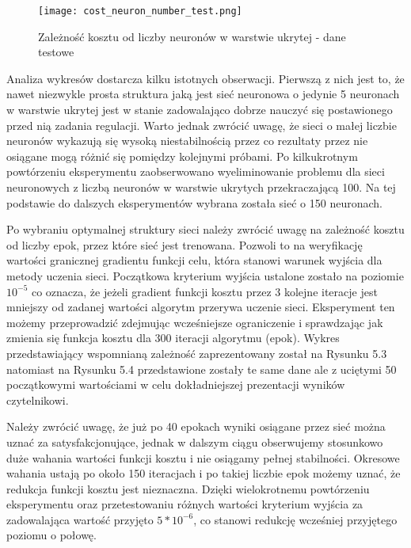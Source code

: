 \begin{figure}[!h]
  \label{fig:Koszt-liczba-neuronow-testowe}
  \centering \texttt{[image: cost\_neuron\_number\_test.png]}
  \caption{Zależność kosztu od liczby neuronów w warstwie ukrytej - dane testowe}
\end{figure}

\par Analiza wykresów dostarcza kilku istotnych obserwacji. Pierwszą z nich jest to, że nawet niezwykle prosta struktura jaką jest sieć neuronowa o jedynie 5 neuronach w warstwie ukrytej jest w stanie zadowalająco dobrze nauczyć się postawionego przed nią zadania regulacji. Warto jednak zwrócić uwagę, że sieci o małej liczbie neuronów wykazują się wysoką niestabilnością przez co rezultaty przez nie osiągane mogą różnić się pomiędzy kolejnymi próbami. Po kilkukrotnym powtórzeniu eksperymentu zaobserwowano wyeliminowanie problemu dla sieci neuronowych z liczbą neuronów w warstwie ukrytych przekraczającą 100. Na tej podstawie do dalszych eksperymentów wybrana została sieć o 150 neuronach. 
\par Po wybraniu optymalnej struktury sieci należy zwrócić uwagę na zależność kosztu od liczby epok, przez które sieć jest trenowana. Pozwoli to na weryfikację wartości granicznej gradientu funkcji celu, która stanowi warunek wyjścia dla metody uczenia sieci. Początkowa kryterium wyjścia ustalone zostało na poziomie \( 10^{-5} \) co oznacza, że jeżeli gradient funkcji kosztu przez 3 kolejne iteracje jest mniejszy od zadanej wartości algorytm przerywa uczenie sieci. Eksperyment ten możemy przeprowadzić zdejmując wcześniejsze ograniczenie i sprawdzając jak zmienia się funkcja kosztu dla 300 iteracji algorytmu (epok). Wykres przedstawiający wspomnianą zależność zaprezentowany został na Rysunku 5.3 natomiast na Rysunku 5.4 przedstawione zostały te same dane ale z uciętymi 50 początkowymi wartościami w celu dokładniejszej prezentacji wyników czytelnikowi.
\par Należy zwrócić uwagę, że już po 40 epokach wyniki osiągane przez sieć można uznać za satysfakcjonujące, jednak w dalszym ciągu obserwujemy stosunkowo duże wahania wartości funkcji kosztu i nie osiągamy pełnej stabilności. Okresowe wahania ustają po około 150 iteracjach i po takiej liczbie epok możemy uznać, że redukcja funkcji kosztu jest nieznaczna. Dzięki wielokrotnemu  powtórzeniu eksperymentu oraz przetestowaniu różnych wartości kryterium wyjścia za zadowalająca wartość przyjęto \( 5*10^{-6} \), co stanowi redukcję wcześniej przyjętego poziomu o połowę.

